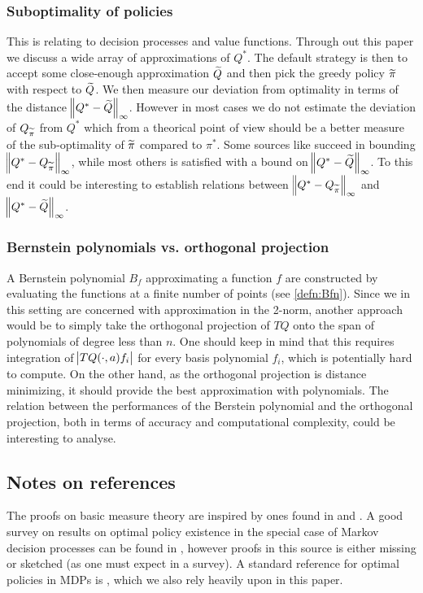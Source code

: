 \subsubsection{Suboptimality of policies}
This is relating to decision processes and value functions.
Through out this paper we discuss a wide array of
approximations of $Q^*$.
The default strategy is then to accept some close-enough approximation $\widetilde{Q}$
and then pick the greedy policy $\widetilde{\pi}$ with respect to $\widetilde{Q}$.
We then measure our deviation from optimality in terms of the distance
$\norm{Q^* - \widetilde{Q}}_\infty$.
However in most cases we do not estimate the deviation of
$Q_{\widetilde{\pi}}$ from $Q^*$ which from a theorical point of view should be
a better measure of the sub-optimality of $\widetilde{\pi}$ compared to $\pi^*$.
Some sources like  succeed in bounding
$\norm{Q^* - Q_{\widetilde{\pi}}}_\infty$,
while most others is satisfied with a bound on $\norm{Q^* - \widetilde{Q}}_\infty$.
To this end it could be interesting to establish relations
between $\norm{Q^* - Q_{\widetilde{\pi}}}_\infty$ and $\norm{Q^* - \widetilde{Q}}_\infty$.

\subsubsection{Bernstein polynomials vs. orthogonal projection}
A Bernstein polynomial $B_f$ approximating a function $f$
are constructed by evaluating the
functions at a finite number of points (see \cref{defn:Bfn}).
Since we in this setting are concerned with approximation in the 2-norm,
another approach would be to simply take the orthogonal projection of
$TQ$ onto the span of polynomials of degree less than $n$.
One should keep in mind that this requires integration of
$\abs{TQ(\cdot, a) f_i}$ for every basis polynomial $f_i$,
which is potentially hard to compute.
On the other hand, as the orthogonal projection is distance minimizing,
it should provide the best approximation with polynomials.
The relation between the performances of the Berstein polynomial
and the orthogonal projection, both in terms of accuracy and 
computational complexity, could be interesting to analyse.

\subsection{Notes on references}
The proofs on basic measure theory are inspired by ones found in
 and .
A good survey on results on optimal policy existence in the special case
of Markov decision processes can be found in ,
however proofs in this source is either missing or sketched
(as one must expect in a survey).
A standard reference for optimal policies in MDPs is ,
which we also rely heavily upon in this paper.

